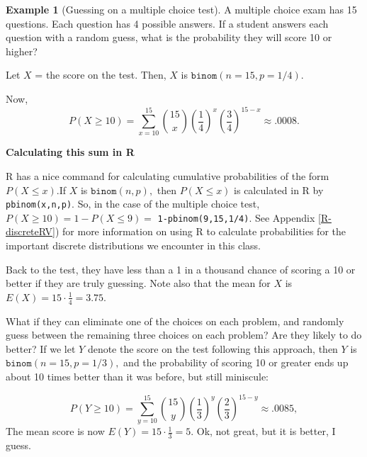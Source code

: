 \documentclass[
]{book}
\theoremstyle{definition}
\theoremstyle{definition}
\newtheorem{example}{Example}[chapter]
\theoremstyle{definition}
\theoremstyle{definition}
\theoremstyle{remark}
\begin{document}
\begin{example}[Guessing on a multiple choice test]
\protect\hypertarget{exm:binom-mult-choice-test}{}\label{exm:binom-mult-choice-test}A multiple choice exam has 15 questions. Each question has 4 possible answers. If a student answers each question with a random guess, what is the probability they will score 10 or higher?

Let \(X\) = the score on the test. Then, \(X\) is \(\texttt{binom}(n=15,p=1/4)\).

Now, \[P(X \geq 10) = \sum_{x = 10}^{15} \binom{15}{x}\left(\frac{1}{4}\right)^x\left(\frac{3}{4}\right)^{15-x} \approx .0008.\]

\textbf{Calculating this sum in R}

R has a nice command for calculating cumulative probabilities of the form \(P(X \leq x)\).If \(X\) is \(\texttt{binom}(n,p),\) then \(P(X \leq x)\) is calculated in R by \texttt{pbinom(x,n,p)}. So, in the case of the multiple choice test, \(P(X \geq 10) = 1 - P(X \leq 9) =\) \texttt{1-pbinom(9,15,1/4)}. See Appendix \ref{R-discreteRV}) for more information on using R to calculate probabilities for the important discrete distributions we encounter in this class.

Back to the test, they have less than a 1 in a thousand chance of scoring a 10 or better if they are truly guessing. Note also that the mean for \(X\) is \(E(X) = 15 \cdot \frac{1}{4} = 3.75\).

What if they can eliminate one of the choices on each problem, and randomly guess between the remaining three choices on each problem? Are they likely to do better? If we let \(Y\) denote the score on the test following this approach, then \(Y\) is \(\texttt{binom}(n=15,p=1/3),\) and the probability of scoring 10 or greater ends up about 10 times better than it was before, but still miniscule:

\[P(Y \geq 10) = \sum_{y = 10}^{15} \binom{15}{y}\left(\frac{1}{3}\right)^y\left(\frac{2}{3}\right)^{15-y} \approx .0085,\]
The mean score is now \(E(Y) = 15\cdot\frac{1}{3} = 5.\) Ok, not great, but it is better, I guess.
\end{example}
\end{document}
